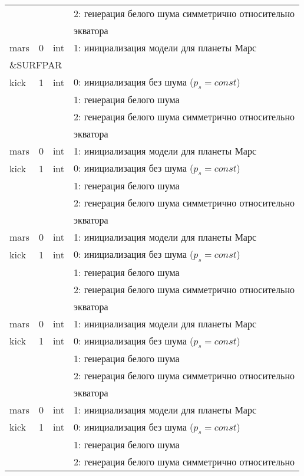 \documentclass[14pt]{extreport}
\begin{document}
\begin{longtable}[c]{|l|c|l|l|}
      &   &     & 2: генерация белого шума симметрично относительно \\
  & & & экватора    \\
 mars & 0 & int & 1: инициализация модели для планеты Марс     \\
 \hline
 \multicolumn{4}{|l|}{\&SURFPAR}        \\ \hline
kick & 1 & int & 0: инициализация без шума ($p_s = const$) \\
      &   &     & 1: генерация белого шума                  \\
      &   &     & 2: генерация белого шума симметрично относительно \\
  & & & экватора    \\
 mars & 0 & int & 1: инициализация модели для планеты Марс     \\
kick & 1 & int & 0: инициализация без шума ($p_s = const$) \\
      &   &     & 1: генерация белого шума                  \\
      &   &     & 2: генерация белого шума симметрично относительно \\
  & & & экватора    \\
 mars & 0 & int & 1: инициализация модели для планеты Марс     \\
kick & 1 & int & 0: инициализация без шума ($p_s = const$) \\
      &   &     & 1: генерация белого шума                  \\
      &   &     & 2: генерация белого шума симметрично относительно \\
  & & & экватора    \\
 mars & 0 & int & 1: инициализация модели для планеты Марс     \\
kick & 1 & int & 0: инициализация без шума ($p_s = const$) \\
      &   &     & 1: генерация белого шума                  \\
      &   &     & 2: генерация белого шума симметрично относительно \\
  & & & экватора    \\
 mars & 0 & int & 1: инициализация модели для планеты Марс     \\
kick & 1 & int & 0: инициализация без шума ($p_s = const$) \\
      &   &     & 1: генерация белого шума                  \\
      &   &     & 2: генерация белого шума симметрично относительно \\

\end{longtable}
\end{document}
